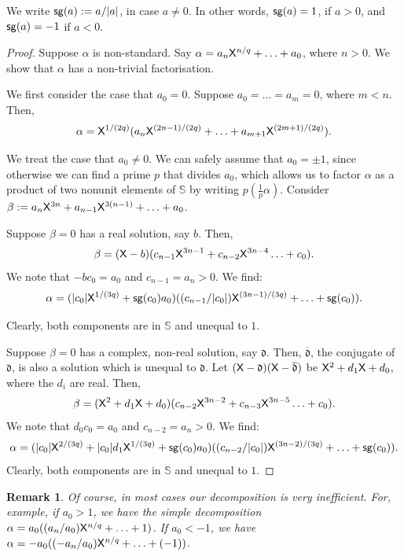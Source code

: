 \documentclass{amsart}
\newtheorem{rem}[theorem]{Remark}
\newcommand{\mf}[1]{{\mathfrak {#1}}}
\newcommand{\X}{{\sf X}}
\newcommand{\sg}{{\sf sg}}
\newcommand{\skippy}{}
\begin{document}
We write $\sg(a) := a/|a|$, in case $a\neq 0$. In other words, $\sg(a)=1$, if $a>0$, and
${\sf sg}(a)=-1$ if $a<0$.

\begin{proof}
    Suppose $\alpha$ is non-standard. Say $\alpha = a_n\X^{n/q}+ \ldots +a_0$, where $n>0$.
    We show that $\alpha$ has a non-trivial factorisation.
    
    \skippy
    We first consider the case that $a_0=0$. Suppose $a_0= \ldots = a_m=0$, where $m<n$. 
    Then, 
     \[\alpha = \X^{1/(2q)} (a_n\X^{(2n-1)/(2q)}+ \ldots + a_{m+1}\X^{(2m+1)/(2q)}). \]
     
    \skippy
    We  treat the case that $a_0\neq 0$. We can safely assume that $a_0 = \pm1$, since otherwise 
    we can find a prime $p$ that divides $a_0$, which allows us to factor $\alpha$ as a 
    product of two nonunit elements of $\mathbb{S}$ by writing $p (\frac{1}{p}\alpha)$. 
    Consider $\beta := a_n\X^{3n}+ a_{n-1}\X^{3(n-1)} + \ldots + a_0$.
    
    Suppose $\beta=0$ has a real solution, say $b$. Then, 
    \[\beta = (\X -b) (c_{n-1}\X^{3n-1} +c_{n-2}\X^{3n-4} \ldots + c_0).\]
    We note that $-bc_0 = a_0$ and $c_{n-1}=a_n>0$.  We find:
    \[  \alpha = (|c_0|\X^{1/(3q)} +\sg(c_0)a_0)((c_{n-1}/|c_0|) \X^{(3n-1)/(3q)} + \ldots + \sg(c_0)).  \] %
  
    Clearly, both components are in $\mathbb S$ and unequal to $1$.
   
       Suppose $\beta=0$ has a complex, non-real solution, say $\mf d$. Then, $\overline {\mf d}$, the conjugate of $\mf d$, is also
    a solution which is unequal to $\mf d$. Let $(\X- \mf d)(\X - \overline{\mf d})$ be $\X^2+ d_1\X + d_0$, where the $d_i$ are real.
    Then,
    \[\beta = (\X^2+ d_1\X + d_0)(c_{n-2}\X^{3n-2} +c_{n-3}\X^{3n-5} \ldots + c_0).\]
    We note that $d_0c_0 = a_0$ and $c_{n-2}=a_n >0$.  We find:
    \[  \alpha = (|c_0|\X^{2/(3q)} +|c_0|d_1 \X^{1/(3q)} +\sg(c_0)a_0)((c_{n-2}/|c_0|) \X^{(3n-2)/(3q)} 
    + \ldots + \sg(c_0)).  \]
    Clearly, both components are in $\mathbb S$ and unequal to $1$.
%
\end{proof}

\begin{rem}
Of course, in most cases our decomposition is very inefficient.
For, example, if $a_0>1$, we have the simple decomposition
$\alpha = a_0 ((a_n/a_0)\X^{n/q}+ \ldots + 1)$. If
$a_0 < -1$, we have $\alpha = -a_0 ((-a_n/a_0)\X^{n/q}+ \ldots + ({-}1))$.
\end{rem}
\end{document}

